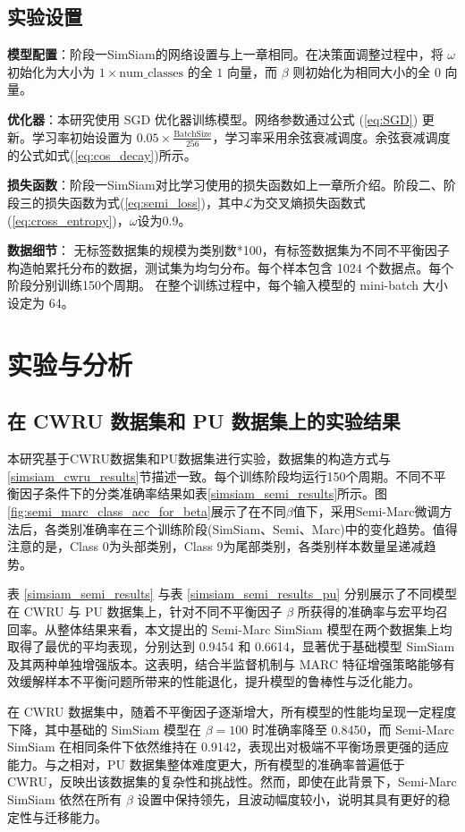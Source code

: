 \documentclass[master]{thesis-uestc}
\begin{document}
\subsection{实验设置}
\textbf{模型配置}：阶段一SimSiam的网络设置与上一章相同。在决策面调整过程中，将 $\omega$ 初始化为大小为 $1 \times \text{num\_classes}$ 的全 $1$ 向量，而 $\beta$ 则初始化为相同大小的全 $0$ 向量。

\textbf{优化器}：本研究使用 SGD 优化器训练模型。网络参数通过公式 (\ref{eq:SGD}) 更新。学习率初始设置为 \( 0.05 \times \frac{\text{BatchSize}}{256} \)，学习率采用余弦衰减调度。余弦衰减调度的公式如式(\ref{eq:cos_decay})所示。

\textbf{损失函数}：阶段一SimSiam对比学习使用的损失函数如上一章所介绍。阶段二、阶段三的损失函数为式(\ref{eq:semi_loss})，其中$\mathcal{L}$为交叉熵损失函数式(\ref{eq:cross_entropy})，$\omega$设为0.9。

\textbf{数据细节}：
无标签数据集的规模为类别数*100，有标签数据集为不同不平衡因子构造帕累托分布的数据，测试集为均匀分布。每个样本包含 1024 个数据点。每个阶段分别训练150个周期。
在整个训练过程中，每个输入模型的 mini-batch 大小设定为 64。
\FloatBarrier  %
\section{实验与分析}

\subsection{在 CWRU 数据集和 PU 数据集上的实验结果}
本研究基于CWRU数据集和PU数据集进行实验，数据集的构造方式与\ref{simsiam_cwru_results}节描述一致。每个训练阶段均运行150个周期。不同不平衡因子条件下的分类准确率结果如表\ref{simsiam_semi_results}所示。图\ref{fig:semi_marc_class_acc_for_beta}展示了在不同$\beta$值下，采用Semi-Marc微调方法后，各类别准确率在三个训练阶段(SimSiam、Semi、Marc)中的变化趋势。值得注意的是，Class 0为头部类别，Class 9为尾部类别，各类别样本数量呈递减趋势。

表 \ref{simsiam_semi_results} 与表 \ref{simsiam_semi_results_pu} 分别展示了不同模型在 CWRU 与 PU 数据集上，针对不同不平衡因子 $\beta$ 所获得的准确率与宏平均召回率。从整体结果来看，本文提出的 Semi-Marc SimSiam 模型在两个数据集上均取得了最优的平均表现，分别达到 0.9454 和 0.6614，显著优于基础模型 SimSiam 及其两种单独增强版本。这表明，结合半监督机制与 MARC 特征增强策略能够有效缓解样本不平衡问题所带来的性能退化，提升模型的鲁棒性与泛化能力。

在 CWRU 数据集中，随着不平衡因子逐渐增大，所有模型的性能均呈现一定程度下降，其中基础的 SimSiam 模型在 $\beta=100$ 时准确率降至 0.8450，而 Semi-Marc SimSiam 在相同条件下依然维持在 0.9142，表现出对极端不平衡场景更强的适应能力。与之相对，PU 数据集整体难度更大，所有模型的准确率普遍低于 CWRU，反映出该数据集的复杂性和挑战性。然而，即使在此背景下，Semi-Marc SimSiam 依然在所有 $\beta$ 设置中保持领先，且波动幅度较小，说明其具有更好的稳定性与迁移能力。
\end{document}
